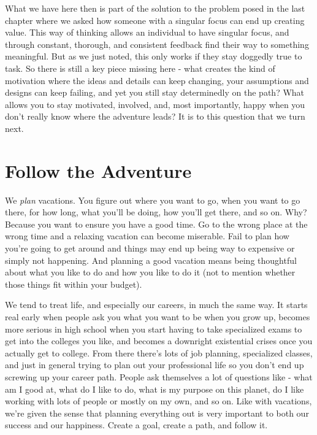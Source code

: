 \documentclass[11pt]{book}
\begin{document}
What we have here then is part of the solution to the problem posed in the last chapter where we asked how someone with a singular focus can end up creating value. This way of thinking allows an individual to have singular focus, and through constant, thorough, and consistent feedback find their way to something meaningful. But as we just noted, this only works if they stay doggedly true to task. So there is still a key piece missing here - what creates the kind of motivation where the ideas and details can keep changing, your assumptions and designs can keep failing, and yet you still stay determinedly on the path? What allows you to stay motivated, involved, and, most importantly, happy when you don't really know where the adventure leads? It is to this question that we turn next.

\chapter{Follow the Adventure}
We \textit{plan} vacations. You figure out where you want to go, when you want to go there, for how long, what you'll be doing, how you'll get there, and so on. Why? Because you want to ensure you have a good time. Go to the wrong place at the wrong time and a relaxing vacation can become miserable. Fail to plan how you're going to get around and things may end up being way to expensive or simply not happening. And planning a good vacation means being thoughtful about what you like to do and how you like to do it (not to mention whether those things fit within your budget). 
\newline

We tend to treat life, and especially our careers, in much the same way. It starts real early when people ask you what you want to be when you grow up, becomes more serious in high school when you start having to take specialized exams to get into the colleges you like, and becomes a downright existential crises once you actually get to college. From there there's lots of job planning, specialized classes, and just in general trying to plan out your professional life so you don't end up screwing up your career path. People ask themselves a lot of questions like - what am I good at, what do I like to do, what is my purpose on this planet, do I like working with lots of people or mostly on my own, and so on. Like with vacations, we're given the sense that planning everything out is very important to both our success and our happiness. Create a goal, create a path, and follow it.
\newline
\end{document}
